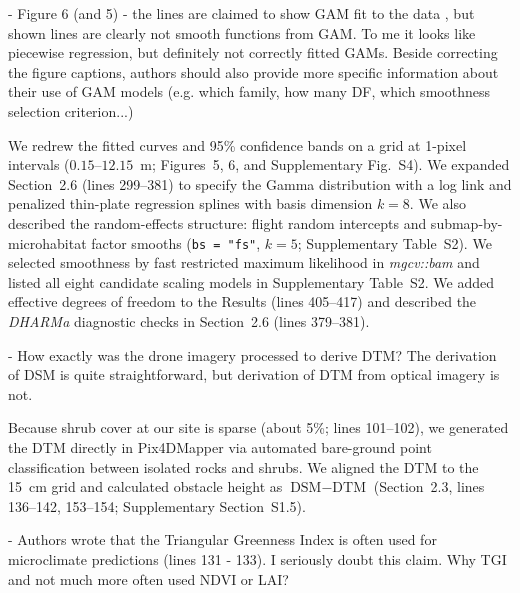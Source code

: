 \documentclass[12pt,english]{reviewresponse}
\begin{document}
\begin{revcomment}
- Figure 6 (and 5) - the lines are claimed to show GAM fit to the data , but shown lines are clearly not smooth functions from GAM. To me it looks like piecewise regression, but definitely not correctly fitted GAMs. Beside correcting the figure captions, authors should also provide more specific information about their use of GAM models (e.g. which family, how many DF, which smoothness selection criterion...)
\end{revcomment}

\begin{revresponse}
We redrew the fitted curves and 95\% confidence bands on a grid at 1-pixel intervals ($0.15\text{--}12.15$~m; Figures~5, 6, and Supplementary Fig.~S4). We expanded Section~2.6 (lines 299--381) to specify the Gamma distribution with a log link and penalized thin-plate regression splines with basis dimension $k = 8$. We also described the random-effects structure: flight random intercepts and submap-by-microhabitat factor smooths (\texttt{bs = "fs"}, $k = 5$; Supplementary Table~S2). We selected smoothness by fast restricted maximum likelihood in \textit{mgcv::bam} and listed all eight candidate scaling models in Supplementary Table~S2. We added effective degrees of freedom to the Results (lines 405--417) and described the \textit{DHARMa} diagnostic checks in Section~2.6 (lines 379--381).
\end{revresponse}

\begin{revcomment}
- How exactly was the drone imagery processed to derive DTM? The derivation of DSM is quite straightforward, but derivation of DTM from optical imagery is not.
\end{revcomment}

\begin{revresponse}
Because shrub cover at our site is sparse (about 5\%; lines 101--102), we generated the DTM directly in Pix4DMapper via automated bare-ground point classification between isolated rocks and shrubs. We aligned the DTM to the 15~cm grid and calculated obstacle height as $\text{DSM} - \text{DTM}$ (Section~2.3, lines 136--142, 153--154; Supplementary Section~S1.5).
\end{revresponse}

\begin{revcomment}
- Authors wrote that the Triangular Greenness Index is often used for microclimate predictions (lines 131 - 133). I seriously doubt this claim. Why TGI and not much more often used NDVI or LAI?
\end{revcomment}
\end{document}
